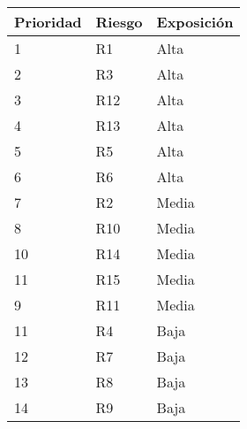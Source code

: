 \begin{center}
    \begin{tabular}{| l | l | l |}
    \hline
	Prioridad & Riesgo & Exposición \\ \hline
	1 & R1 & Alta \\ \hline
	2 &	R3 & Alta \\ \hline
	3 &	R12 & Alta \\ \hline
	4 &	R13	& Alta \\ \hline
	5 &	R5 & Alta \\ \hline
	6 &	R6 & Alta \\ \hline
	7 &	R2 & Media \\ \hline
	8 &	R10 & Media \\ \hline
	10 & R14 & Media \\ \hline
	11 &  R15 & Media \\ \hline
	9 &	R11 & Media \\ \hline
	11 & R4 & Baja \\ \hline
	12 & R7 & Baja \\ \hline
	13 & R8 & Baja \\ \hline
	14 & R9 & Baja \\ \hline
    \end{tabular}
\end{center}